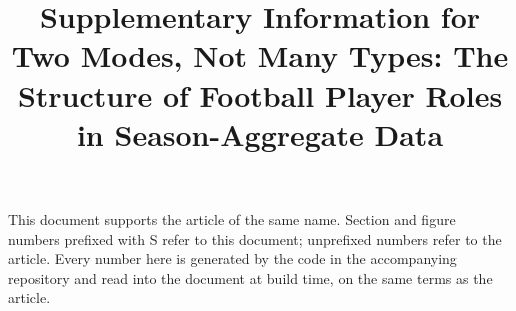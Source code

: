 \documentclass[11pt]{article}
\title{Supplementary Information for\\
Two Modes, Not Many Types: The Structure of Football Player Roles in
Season-Aggregate Data}
\begin{document}
\maketitle

\noindent
This document supports the article of the same name. Section and figure numbers prefixed
with S refer to this document; unprefixed numbers refer to the article. Every number here
is generated by the code in the accompanying repository and read into the document at build
time, on the same terms as the article.

\vspace{1em}

\makeatletter
\renewcommand{\l@section}{\@dottedtocline{1}{0em}{2.6em}}
\makeatother
{\setcounter{tocdepth}{1}\tableofcontents}

\clearpage





\clearpage

\end{document}
